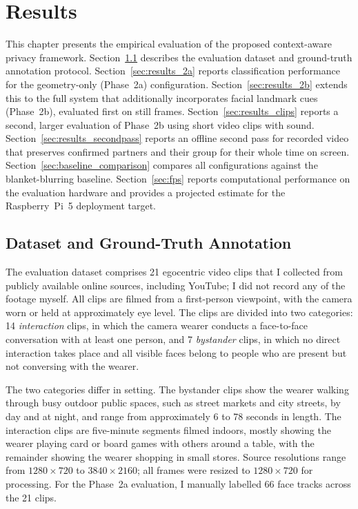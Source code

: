 \newsavebox{\fitbox}
\newcommand{\fitwidth}[1]{\sbox{\fitbox}{#1}%
  \ifdim\wd\fitbox>\linewidth\resizebox{\linewidth}{!}{\usebox{\fitbox}}%
  \else\usebox{\fitbox}\fi}

\chapter{Results}
\label{sec:results}

This chapter presents the empirical evaluation of the proposed context-aware
privacy framework. Section~\ref{sec:dataset} describes the evaluation dataset and ground-truth
annotation protocol. Section~\ref{sec:results_2a} reports classification performance for the
geometry-only (Phase~2a) configuration. Section~\ref{sec:results_2b} extends this to the full
system that additionally incorporates facial landmark cues (Phase~2b), evaluated
first on still frames. Section~\ref{sec:results_clips} reports a second, larger evaluation of Phase~2b
using short video clips with sound. Section~\ref{sec:results_secondpass} reports an offline second pass for
recorded video that preserves confirmed partners and their group for their whole
time on screen. Section~\ref{sec:baseline_comparison} compares all configurations against the
blanket-blurring baseline. Section~\ref{sec:fps} reports computational performance on the
evaluation hardware and provides a projected estimate for the Raspberry~Pi~5
deployment target.

\section{Dataset and Ground-Truth Annotation}
\label{sec:dataset}

The evaluation dataset comprises 21 egocentric video clips that I collected from
publicly available online sources, including YouTube; I did not record any of the
footage myself. All clips are filmed from a first-person viewpoint, with the camera worn
or held at approximately eye level. The clips are divided into two categories:
14 \emph{interaction} clips, in which the camera wearer conducts a face-to-face
conversation with at least one person, and 7 \emph{bystander} clips, in which no
direct interaction takes place and all visible faces belong to people who are
present but not conversing with the wearer.

The two categories differ in setting. The bystander clips show the wearer walking
through busy outdoor public spaces, such as street markets and city streets, by day
and at night, and range from approximately 6 to 78 seconds in length. The
interaction clips are five-minute segments filmed indoors, mostly showing the wearer
playing card or board games with others around a table, with the remainder showing
the wearer shopping in small stores. Source resolutions range from
$1280 \times 720$ to $3840 \times 2160$; all frames were resized to
$1280 \times 720$ for processing. For the Phase~2a evaluation, I manually
labelled 66 face tracks across the 21 clips.


